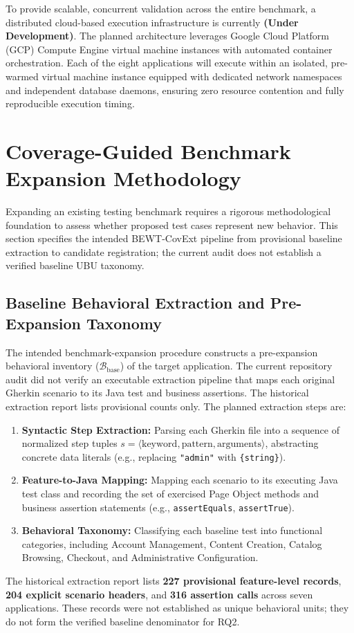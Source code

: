 \documentclass[pdflatex,sn-mathphys-num]{sn-jnl}
\begin{document}
To provide scalable, concurrent validation across the entire benchmark, a distributed cloud-based execution infrastructure is currently \textbf{(Under Development)}. The planned architecture leverages Google Cloud Platform (GCP) Compute Engine virtual machine instances with automated container orchestration. Each of the eight applications will execute within an isolated, pre-warmed virtual machine instance equipped with dedicated network namespaces and independent database daemons, ensuring zero resource contention and fully reproducible execution timing.


\section{Coverage-Guided Benchmark Expansion Methodology}\label{sec:methodology}

Expanding an existing testing benchmark requires a rigorous methodological foundation to assess whether proposed test cases represent new behavior. This section specifies the intended BEWT-CovExt pipeline from provisional baseline extraction to candidate registration; the current audit does not establish a verified baseline UBU taxonomy.

\subsection{Baseline Behavioral Extraction and Pre-Expansion Taxonomy}

The intended benchmark-expansion procedure constructs a pre-expansion behavioral inventory ($\mathcal{B}_{\text{base}}$) of the target application. The current repository audit did not verify an executable extraction pipeline that maps each original Gherkin scenario to its Java test and business assertions. The historical extraction report lists provisional counts only. The planned extraction steps are:
\begin{enumerate}
    \item \textbf{Syntactic Step Extraction:} Parsing each Gherkin file into a sequence of normalized step tuples $s = \langle \text{keyword}, \text{pattern}, \text{arguments} \rangle$, abstracting concrete data literals (e.g., replacing \texttt{"admin"} with \texttt{\{string\}}).
    \item \textbf{Feature-to-Java Mapping:} Mapping each scenario to its executing Java test class and recording the set of exercised Page Object methods and business assertion statements (e.g., \texttt{assertEquals}, \texttt{assertTrue}).
    \item \textbf{Behavioral Taxonomy:} Classifying each baseline test into functional categories, including Account Management, Content Creation, Catalog Browsing, Checkout, and Administrative Configuration.
\end{enumerate}
The historical extraction report lists \textbf{227 provisional feature-level records}, \textbf{204 explicit scenario headers}, and \textbf{316 assertion calls} across seven applications. These records were not established as unique behavioral units; they do not form the verified baseline denominator for RQ2.
\end{document}
